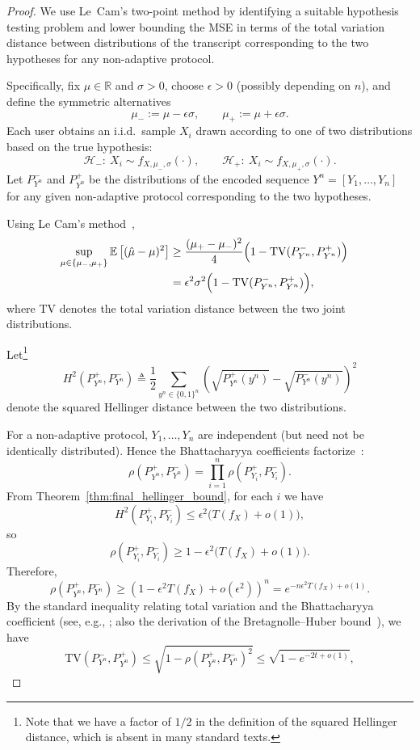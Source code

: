 \documentclass[10pt]{article} %
\theoremstyle{plain}
\theoremstyle{definition}
\theoremstyle{remark}
\newcommand{\bE}{\mathbb E}
\begin{document}
\begin{proof}
We use Le~Cam's two-point method by identifying a suitable hypothesis testing problem and lower bounding the MSE in terms of the total variation distance between distributions of the transcript corresponding to the two hypotheses for any non-adaptive protocol.

Specifically, fix $\mu \in \mathbb{R}$ and $\sigma>0$, choose $\epsilon>0$ (possibly depending on $n$), and define the symmetric alternatives
\begin{equation}\label{eq:muplus_muminus}
\mu_- := \mu - \epsilon\sigma, 
\qquad 
\mu_+ := \mu + \epsilon\sigma.
\end{equation}
Each user obtains an i.i.d.\ sample $X_i$ drawn according to one of two distributions based on the true hypothesis:
\[
\mathcal{H}_-:\ X_i \sim f_{X,\mu_-,\sigma}(\cdot),
\qquad
\mathcal{H}_+:\ X_i \sim f_{X,\mu_+,\sigma}(\cdot).
\]
Let $P^-_{Y^n}$ and $P^+_{Y^n}$ be the distributions of the encoded sequence
$Y^n = [Y_1,\ldots,Y_n]$ for any given non-adaptive protocol corresponding to the two hypotheses.

Using Le Cam's method~\citep[Theorem 10.2]{wu2020information},
\begin{align}
 \sup_{\mu \in \{ \mu_-, \mu_+ \} }\bE \left[(\hat{\mu}-\mu)^2\right] 
 &\geq \frac{(\mu_+ - \mu_-)^2}{4} 
 \Bigl(1 - \mathrm{TV}(P^-_{Y^n},P^+_{Y^n})\Bigr) &\label{eq:Le_cam_method}\\
&= \epsilon^2\sigma^2\Bigl(1 - \mathrm{TV}(P^-_{Y^n},P^+_{Y^n})\Bigr),
\end{align}
where $\mathrm{TV}$ denotes the total variation distance between the two joint distributions.

Let\footnote{Note that we have a factor of $1/2$ in the definition of the squared Hellinger distance, which is absent in many standard texts.} 
\[
H^2(P_{Y^n}^+,P_{Y^n}^-) \triangleq \frac{1}{2} \sum_{y^n\in\{0,1\}^n }\left(\sqrt{P_{Y^n}^+(y^n)}-\sqrt{P_{Y^n}^-(y^n)}\right)^2 
\]
denote the squared Hellinger distance between the two distributions. 

For a non-adaptive protocol, $Y_1,\ldots,Y_n$ are independent (but need not be identically distributed).  
Hence the Bhattacharyya coefficients factorize~\citep[Proposition 1.4]{wright2024lecture5}:
\[
\rho (P_{Y^n}^+,P_{Y^n}^-)  = \prod_{i=1}^n \rho (P_{Y_i}^+,P_{Y_i}^-).
\]
From Theorem~\ref{thm:final_hellinger_bound}, for each $i$ we have
\[
H^2(P_{Y_i}^+,P_{Y_i}^-) \leq \epsilon^2\big(T(f_X)+o(1)\big),
\]
so
\[
\rho (P_{Y_i}^+,P_{Y_i}^-)  \geq  1-\epsilon^2\big(T(f_X)+o(1)\big).
\]
Therefore,
\[
\rho (P_{Y^n}^+,P_{Y^n}^-)  \geq  (1-\epsilon^2T(f_X)+o(\epsilon^2))^n
= e^{-n\epsilon^2 T(f_X)+o(1)}.
\] 
By the standard inequality relating total variation and the Bhattacharyya coefficient 
(see, e.g., \citep[ cf. Lemma~2.6]{tsybakov2009introduction};  also the derivation of the Bretagnolle--Huber bound~\citep{bretagnolle1979estimation}), we have
\[
\mathrm{TV}(P^-_{Y^n},P^+_{Y^n})
 \leq  \sqrt{1-\rho (P_{Y^n}^+,P_{Y^n}^-)^2}
 \leq  \sqrt{1-e^{-2t+o(1)}},
\]



\end{proof}
\end{document}
